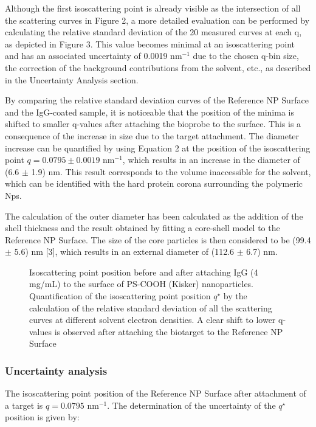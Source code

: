 Although the first isoscattering point is already visible as the intersection of all the scattering curves in Figure 2, a more detailed evaluation can be performed by calculating the relative standard deviation of the 20 measured curves at each q, as depicted in Figure 3. This value becomes minimal at an isoscattering point and has an associated uncertainty of 0.0019 nm$^{-1}$ due to the chosen q-bin size, the correction of the background contributions from the solvent, etc., as described in the Uncertainty Analysis section.

By comparing the relative standard deviation curves of the Reference NP Surface and the IgG-coated sample, it is noticeable that the position of the minima is shifted to smaller q-values after attaching the bioprobe to the surface. This is a consequence of the increase in size due to the target attachment. The diameter increase can be quantified by using Equation 2 at the position of the isoscattering point $q=0.0795\pm0.0019$ nm$^{-1}$, which results in an increase in the diameter of (6.6 $\pm$ 1.9) nm. This result corresponds to the volume inaccessible for the solvent, which can be identified with the hard protein corona surrounding the polymeric Nps.

The calculation of the outer diameter has been calculated as the addition of the shell thickness and the result obtained by fitting a core-shell model to the Reference NP Surface. The size of the core particles is then considered to be  (99.4 $\pm$ 5.6) nm [3], which results in an external diameter of (112.6 $\pm$ 6.7) nm.

\begin{figure}
	\centering
		
		\caption{Isoscattering point position before and after attaching IgG (4 mg/mL) to the surface of PS-COOH (Kisker) nanoparticles. Quantification of the isoscattering point position $q^{\star}$ by the calculation of the relative standard deviation of all the scattering curves at different solvent electron densities. A clear shift to lower q-values is observed after attaching the biotarget to the Reference NP Surface}
		\label{fig:CoatedKiskerIsopointComp}
\end{figure}

\subsubsection{Uncertainty analysis}

The isoscattering point position of the Reference NP Surface after attachment of a target is  $q=0.0795$ nm$^{-1}$. The determination of the uncertainty of the $q^{\star}$ position is given by:

